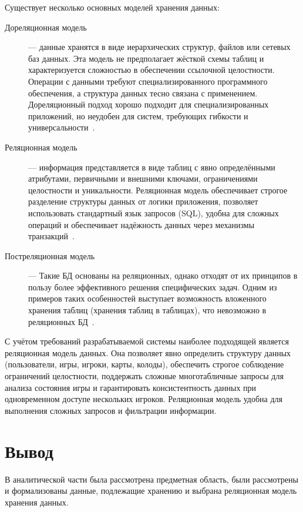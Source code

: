 Существует несколько основных моделей хранения данных:

\begin{description}
	\item[Дореляционная модель] --- данные хранятся в виде иерархических
		структур, файлов или сетевых баз данных. Эта модель не
		предполагает жёсткой
		схемы таблиц и характеризуется сложностью в обеспечении
		ссылочной целостности.
		Операции с данными требуют специализированного программного
		обеспечения, а
		структура данных тесно связана с применением. Дореляционный
		подход хорошо
		подходит для специализированных приложений, но неудобен для
		систем, требующих
		гибкости и универсальности~\cite{lectures}.

	\item[Реляционная модель] --- информация представляется в виде таблиц с
		явно определёнными атрибутами, первичными и внешними ключами,
		ограничениями
		целостности и уникальности. Реляционная модель обеспечивает
		строгое разделение
		структуры данных от логики приложения, позволяет использовать
		стандартный язык
		запросов (SQL), удобна для сложных операций и обеспечивает
		надёжность данных
		через механизмы транзакций~\cite{date}.

	\item[Постреляционная модель] --- Такие БД основаны на реляционных,
		однако
		отходят от их принципов в пользу более эффективного решения
		специфических
		задач. Одним из примеров таких особенностей выступает
		возможность вложенного
		хранения таблиц (хранения таблиц в таблицах), что невозможно в
		реляционных
		БД~\cite{postrel}.
\end{description}

С учётом требований разрабатываемой системы наиболее подходящей является
реляционная модель данных. Она позволяет явно определить структуру данных
(пользователи, игры, игроки, карты, колоды), обеспечить строгое соблюдение
ограничений целостности, поддержать сложные многотабличные запросы для анализа
состояния игры и гарантировать консистентность данных при одновременном доступе
нескольких игроков. Реляционная модель удобна для выполнения сложных запросов и
фильтрации информации.

\section*{Вывод}

В аналитической части была рассмотрена предметная область, были рассмотрены и
формализованы данные, подлежащие хранению и выбрана реляционная модель хранения
данных.